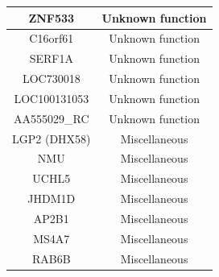 {\begin{longtable}[!htb]{|c|c|}
\hline
ZNF533 & Unknown function \\
\hline
C16orf61 & Unknown function \\
\hline
SERF1A & Unknown function \\
\hline
LOC730018 & Unknown function \\
\hline
LOC100131053 & Unknown function \\
\hline
AA555029\_RC & Unknown function \\
\hline
LGP2 (DHX58) & Miscellaneous \\
\hline
NMU & Miscellaneous \\
\hline
UCHL5 & Miscellaneous \\
\hline
JHDM1D & Miscellaneous \\
\hline
AP2B1 & Miscellaneous \\
\hline
MS4A7 & Miscellaneous \\
\hline
RAB6B & Miscellaneous \\
\hline
\end{longtable}
}

